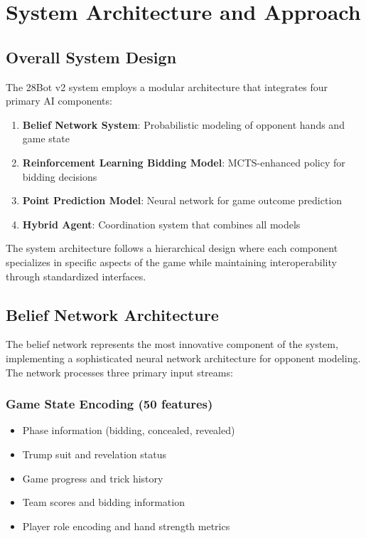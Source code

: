 \documentclass[conference]{IEEEtran}
\begin{document}
\section{System Architecture and Approach}

\subsection{Overall System Design}

The 28Bot v2 system employs a modular architecture that integrates four primary AI components:

\begin{enumerate}
    \item \textbf{Belief Network System}: Probabilistic modeling of opponent hands and game state
    \item \textbf{Reinforcement Learning Bidding Model}: MCTS-enhanced policy for bidding decisions
    \item \textbf{Point Prediction Model}: Neural network for game outcome prediction
    \item \textbf{Hybrid Agent}: Coordination system that combines all models
\end{enumerate}

The system architecture follows a hierarchical design where each component specializes in specific aspects of the game while maintaining interoperability through standardized interfaces.

\subsection{Belief Network Architecture}

The belief network represents the most innovative component of the system, implementing a sophisticated neural network architecture for opponent modeling. The network processes three primary input streams:

\subsubsection{Game State Encoding (50 features)}
\begin{itemize}
    \item Phase information (bidding, concealed, revealed)
    \item Trump suit and revelation status
    \item Game progress and trick history
    \item Team scores and bidding information
    \item Player role encoding and hand strength metrics
\end{itemize}
\end{document}

